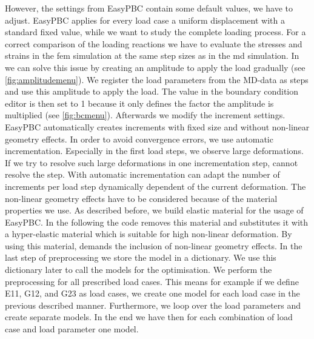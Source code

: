 However, the settings from EasyPBC contain some default values, we have to adjust. EasyPBC applies for every load case a uniform displacement with a standard fixed value, while we want to study the complete loading process. For a correct comparison of the loading reactions we have to evaluate the stresses and strains in the \acrshort{fem} simulation at the same step sizes as in the \acrshort{md} simulation. In  we can solve this issue by creating an amplitude to apply the load gradually (see \autoref{fig:amplitudemenu}). We register the load parameters from the MD-data as steps and use this amplitude to apply the load. The value in the boundary condition editor is then set to 1 because it only defines the factor the amplitude is multiplied (see \autoref{fig:bcmenu}). Afterwards we modify the increment settings. EasyPBC automatically creates increments with fixed size and without non-linear geometry effects. In order to avoid convergence errors, we use automatic incrementation. Especially in the first load steps, we observe large deformations. If we try to resolve such large deformations in one incrementation step,  cannot resolve the step. With automatic incrementation  can adapt the number of increments per load step dynamically dependent of the current deformation. The non-linear geometry effects have to be considered because of the material properties we use. As described before, we build elastic material for the usage of EasyPBC. In the following the code removes this material and substitutes it with a hyper-elastic material which is suitable for high non-linear deformation. By using this material,  demands the inclusion of non-linear geometry effects. In the last step of preprocessing we store the model in a dictionary. We use this dictionary later to call the models for the optimisation. We perform the preprocessing for all prescribed load cases. This means for example if we define E11, G12, and G23 as load cases, we create one model for each load case in the previous described manner. Furthermore, we loop over the load parameters and create separate models. In the end we have then for each combination of load case and load parameter one model. 



